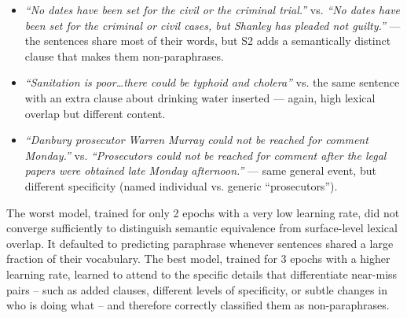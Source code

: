\documentclass[12pt]{article}
\begin{document}
\begin{itemize}

    \item \textit{``No dates have been set for the civil or the criminal trial.''} vs.
    \textit{``No dates have been set for the criminal or civil cases, but Shanley has
    pleaded not guilty.''} — the sentences share most of their words, but S2 adds a
    semantically distinct clause that makes them non-paraphrases.

    \item \textit{``Sanitation is poor\ldots there could be typhoid and cholera''} vs.
    the same sentence with an extra clause about drinking water inserted — again, high
    lexical overlap but different content.

    \item \textit{``Danbury prosecutor Warren Murray could not be reached for comment
    Monday.''} vs. \textit{``Prosecutors could not be reached for comment after the legal
    papers were obtained late Monday afternoon.''} — same general event, but different
    specificity (named individual vs. generic ``prosecutors'').

\end{itemize}

The worst model, trained for only 2 epochs with a very low learning rate, did not converge
sufficiently to distinguish semantic equivalence from surface-level lexical overlap. It
defaulted to predicting paraphrase whenever sentences shared a large fraction of their
vocabulary. The best model, trained for 3 epochs with a higher learning rate, learned to
attend to the specific details that differentiate near-miss pairs -- such as added clauses,
different levels of specificity, or subtle changes in who is doing what -- and therefore
correctly classified them as non-paraphrases.
\end{document}
